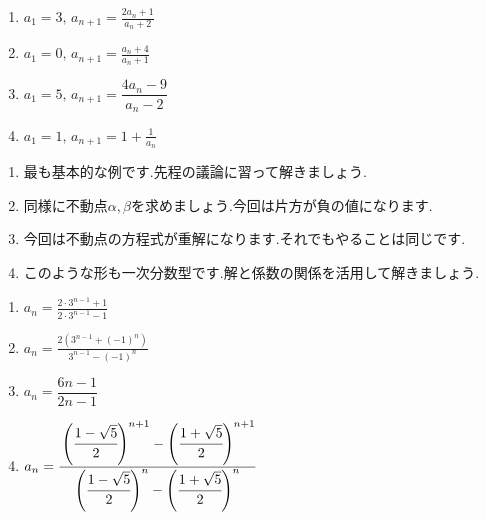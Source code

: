    \noindent {}
    \begin{enumerate}[label=(\arabic*),parsep=3pt,format=\bookitemlink{example-fractional-2}{problem}{answer}]
      \item $\displaystyle a_1=3,\, a_{n+1}=\frac{2a_n+1}{a_n+2}$
      \item $\displaystyle a_1=0,\, a_{n+1}=\frac{a_n+4}{a_n+1}$
      \item $\displaystyle a_1=5,\, a_{n+1}=\dfrac{4a_{n}-9}{a_{n}-2}$
      \item $\displaystyle a_1=1,\, a_{n+1}=1+\frac{1}{a_n}$
    \end{enumerate}

    \noindent{}
    \begin{enumerate}[label=(\arabic*),parsep=3pt,format=\bookitemlink{example-fractional-2}{hint}{problem}]
      \item 最も基本的な例です.先程の議論に習って解きましょう.
      \item 同様に不動点$\alpha,\beta$を求めましょう.今回は片方が負の値になります.
      \item 今回は不動点の方程式が重解になります.それでもやることは同じです.
      \item このような形も一次分数型です.解と係数の関係を活用して解きましょう.
    \end{enumerate}

    \noindent{}
    \begin{enumerate}[label=(\arabic*),parsep=3pt,format=\bookitemlink{example-fractional-2}{answer}{problem}]
      \item $\displaystyle a_n=\frac{2\cdot3^{n-1}+1}{2\cdot3^{n-1}-1}$
      \item $\displaystyle a_n=\frac{2\left(3^{n-1}+(-1)^n\right)}{3^{n-1}-(-1)^n}$
      \item $a_{n}=\dfrac{6n-1}{2n-1}$
      \item $\displaystyle a_n=\cfrac{\left(\cfrac{1-\sqrt{5}}{2}\right)^{n+1}-\left(\cfrac{1+\sqrt{5}}{2}\right)^{n+1}}{\left(\cfrac{1-\sqrt{5}}{2}\right)^n-\left(\cfrac{1+\sqrt{5}}{2}\right)^n}$
    \end{enumerate}

